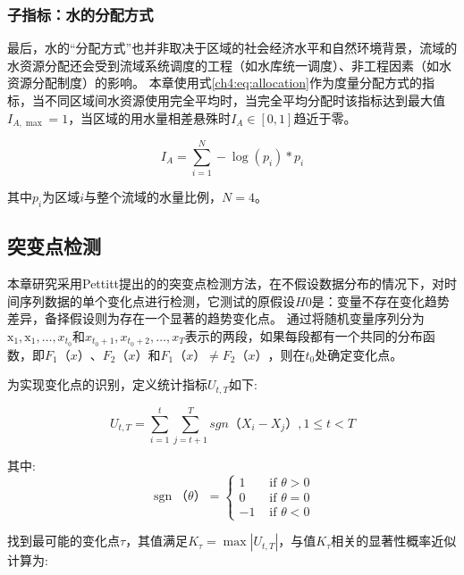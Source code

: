 \subsubsection{子指标：水的分配方式}

最后，水的“分配方式”也并非取决于区域的社会经济水平和自然环境背景，流域的水资源分配还会受到流域系统调度的工程（如水库统一调度）、非工程因素（如水资源分配制度）的影响\cite{schmandt2021,speed2013}。
本章使用式\ref{ch4:eq:allocation}作为度量分配方式的指标，当不同区域间水资源使用完全平均时，当完全平均分配时该指标达到最大值$I_{A, \max} = 1$，当区域的用水量相差悬殊时$I_A \in [0, 1]$趋近于零。

\begin{equation}
    I_A = \sum_{i=1}^N - \log(p_{i}) * p_{i}
    \label{ch4:eq:allocation}
\end{equation}

其中$p_{i}$为区域$i$与整个流域的水量比例，$N=4$。

\subsection{突变点检测}

本章研究采用Pettitt提出的的突变点检测方法，在不假设数据分布的情况下，对时间序列数据的单个变化点进行检测\cite{pettitt1979}，它测试的原假设$H0$是：变量不存在变化趋势差异，备择假设则为存在一个显著的趋势变化点。
通过将随机变量序列分为$\mathrm{x}_{1}, \mathrm{x}_{1}, \ldots, x_{t_{0}}$和$x_{t_{0}+1}, x_{t_{0}+2}, \ldots, x_{T}$表示的两段，如果每段都有一个共同的分布函数，即$F_1（x）$、$F_2（x）$和$F_1（x） \neq F_2（x）$，则在$t_0$处确定变化点。

为实现变化点的识别，定义统计指标$U_{t,T}$如下:

\begin{equation}
    U_{t, T} = \sum_{i=1}^t\sum_{j=t+1}^T sgn（X_i - X_j）, 1 \leq t < T
\end{equation}

其中:
\begin{equation}
    \operatorname{sgn}（\theta）= \begin{cases}1 & \text { if } \theta>0 \\ 0 & \text { if } \theta=0 \\ -1 & \text { if } \theta<0\end{cases}
\end{equation}

找到最可能的变化点$\tau$，其值满足$K_{\tau} = \max|U_{t, T}|$，与值$K_{\tau}$相关的显著性概率近似计算为:

